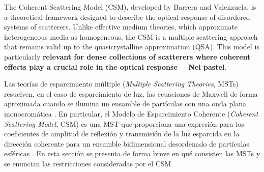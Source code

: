 
The Coherent Scattering Model (CSM), developed by Barrera and Valenzuela, is a theoretical framework designed to describe the optical response of disordered systems of scatterers. Unlike effective medium theories, which approximate heterogeneous media as homogeneous, the CSM is a multiple scattering approach that remains valid up to the quasicrystalline approximation (QSA). This model is particularly\textbf{ relevant for dense collections of scatterers where coherent effects play a crucial role in the optical response ---Nel pastel}.










Las teorías de esparcimiento múltiple (\textit{Multiple Scattering Theories}, MSTs) resuelven, en el caso de esparcimiento de luz, las ecuaciones de Maxwell de forma aproximada cuando se ilumina un ensamble de partículas con una onda plana monocromática \cite{loiko_monolayers_1998,barrera1991optical,reyes2018analytical}. En particular, el  Modelo de Esparcimiento Coherente (\textit{Coherent Scattering Model}, CSM)  es una MST que proporciona una expresión para los coeficientes de amplitud de reflexión y transmisión de la luz esparcida en la dirección coherente para un ensamble bidimensional desordenado de partículas esféricas \cite{barrera_coherent_2003,garcia2012multiple,reyes2018analytical}. En esta sección se presenta de forma breve en qué consisten las MSTs y se enuncian las restricciones consideradas por el CSM.

